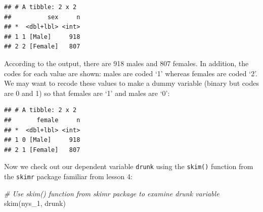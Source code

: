 \documentclass[
]{book}
\newenvironment{Shaded}{\begin{snugshade}}{\end{snugshade}}
\newcommand{\AttributeTok}[1]{\textcolor[rgb]{0.77,0.63,0.00}{#1}}
\newcommand{\CommentTok}[1]{\textcolor[rgb]{0.56,0.35,0.01}{\textit{#1}}}
\newcommand{\DecValTok}[1]{\textcolor[rgb]{0.00,0.00,0.81}{#1}}
\newcommand{\FunctionTok}[1]{\textcolor[rgb]{0.00,0.00,0.00}{#1}}
\newcommand{\NormalTok}[1]{#1}
\newcommand{\OtherTok}[1]{\textcolor[rgb]{0.56,0.35,0.01}{#1}}
\newcommand{\SpecialCharTok}[1]{\textcolor[rgb]{0.00,0.00,0.00}{#1}}
\newcommand{\StringTok}[1]{\textcolor[rgb]{0.31,0.60,0.02}{#1}}
\begin{document}
\begin{verbatim}
## # A tibble: 2 x 2
##          sex     n
## *  <dbl+lbl> <int>
## 1 1 [Male]     918
## 2 2 [Female]   807
\end{verbatim}

According to the output, there are 918 males and 807 females. In addition, the codes for each value are shown: males are coded `1' whereas females are coded `2'. We may want to recode these values to make a dummy variable (binary but codes are 0 and 1) so that females are `1' and males are `0':

\begin{Shaded}
\end{Shaded}

\begin{verbatim}
## # A tibble: 2 x 2
##       female     n
## *  <dbl+lbl> <int>
## 1 0 [Male]     918
## 2 1 [Female]   807
\end{verbatim}

Now we check out our dependent variable \texttt{drunk} using the \texttt{skim()} function from the \texttt{skimr} package familiar from lesson 4:

\begin{Shaded}
\begin{Highlighting}[]
\CommentTok{\# Use skim() function from skimr package to examine drunk variable }
\FunctionTok{skim}\NormalTok{(nys\_1, drunk)}
\end{Highlighting}
\end{Shaded}
\end{document}
